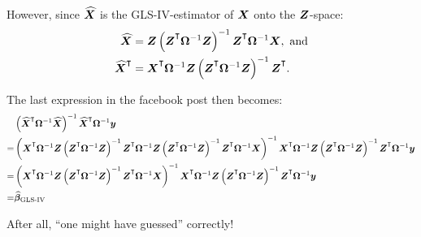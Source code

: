 \bigskip

However, since $\widehat{\boldsymbol{X}}$ is the GLS-IV-estimator of $\boldsymbol{X}$ onto the $\boldsymbol{Z}$-space:
\begin{equation*}
  \begin{aligned}
    \mhat{X} &= \m{Z} \left( \T{Z} \inv{\Omega} \m{Z} \right)^{-1} \T{Z} \inv{\Omega} \m{X},\ \text{and}\\
    \mhat{X}\Ts &= \T{X} \inv{\Omega} \m{Z} \left( \T{Z} \inv{\Omega} \m{Z} \right)^{-1} \T{Z}.
  \end{aligned}
\end{equation*}

The last expression in the facebook post then becomes:
\begin{equation*}
  \begin{aligned}
      &\left( \mhat{X}\Ts \inv{\Omega} \mhat{X} \right)^{-1} \mhat{X}\Ts \inv{\Omega} \m{y}\\
      = &\left( \T{X} \inv{\Omega} \m{Z} \left( \T{Z} \inv{\Omega} \m{Z} \right)^{-1} \T{Z} \inv{\Omega} \m{Z} \left( \T{Z} \inv{\Omega} \m{Z} \right)^{-1} \T{Z} \inv{\Omega} \m{X} \right)^{-1} \T{X} \inv{\Omega} \m{Z} \left( \T{Z} \inv{\Omega} \m{Z} \right)^{-1} \T{Z} \inv{\Omega} \m{y}\\
      = & \left( \T{X} \inv{\Omega} \m{Z} \left( \T{Z} \inv{\Omega} \m{Z} \right)^{-1} \T{Z} \inv{\Omega} \m{X} \right)^{-1} \T{X} \inv{\Omega} \m{Z} \left( \T{Z} \inv{\Omega} \m{Z} \right)^{-1} \T{Z} \inv{\Omega} \m{y}\\
      = &\mhat{\beta}_{\text{GLS-IV}}
  \end{aligned}
\end{equation*}

After all, ``one might have guessed'' correctly!